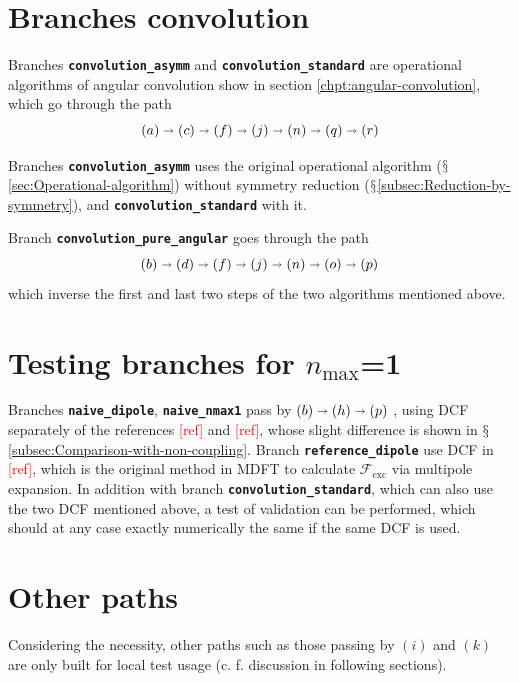 \section{Branches \textquotedbl{}convolution\textquotedbl{}}

Branches\textbf{ }\texttt{\textbf{convolution\_asymm}} and \texttt{\textbf{convolution\_standard}}
are operational algorithms of angular convolution show in section
\ref{chpt:angular-convolution}, which go through the path 
\[
\left(a\right)\shortrightarrow\left(c\right)\shortrightarrow\left(f\right)\shortrightarrow\left(j\right)\shortrightarrow\left(n\right)\shortrightarrow\left(q\right)\shortrightarrow\left(r\right)
\]

Branches\textbf{ }\texttt{\textbf{convolution\_asymm}} uses the original
operational algorithm ($\mathsection$\ref{sec:Operational-algorithm})
without symmetry reduction ($\mathsection$\ref{subsec:Reduction-by-symmetry}),
and \texttt{\textbf{convolution\_standard}} with it. 

Branch \texttt{\textbf{convolution\_pure\_angular}} goes through the
path 
\[
\left(b\right)\shortrightarrow\left(d\right)\shortrightarrow\left(f\right)\shortrightarrow\left(j\right)\shortrightarrow\left(n\right)\shortrightarrow\left(o\right)\shortrightarrow\left(p\right)
\]
which inverse the first and last two steps of the two algorithms mentioned
above.

\section{Testing branches for $n_{\max}$=1}

Branches \texttt{\textbf{naive\_dipole}}, \texttt{\textbf{naive\_nmax1}}
pass by $\left(b\right)\shortrightarrow\left(h\right)\shortrightarrow\left(p\right)$
, using DCF separately of the references \textcolor{red}{{[}ref{]}}
and \textcolor{red}{{[}ref{]}}, whose slight difference is shown in
$\mathsection$\ref{subsec:Comparison-with-non-coupling}. Branch
\texttt{\textbf{reference\_dipole}} use DCF in \textcolor{red}{{[}ref{]}},
which is the original method in MDFT to calculate $\mathcal{F}_{\mathrm{exc}}$
via multipole expansion. In addition with branch \texttt{\textbf{convolution\_standard}},
which can also use the two DCF mentioned above, a test of validation
can be performed, which should at any case exactly numerically the
same if the same DCF is used.

\section{Other paths}

Considering the necessity, other paths such as those passing by $\left(i\right)$
and $\left(k\right)$ are only built for local test usage (c. f. discussion
in following sections).
